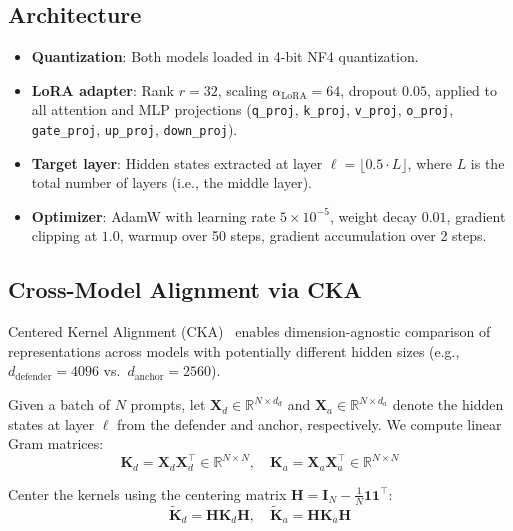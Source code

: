 \documentclass[11pt]{article}
\newcommand{\R}{\mathbb{R}}
\begin{document}
\subsection{Architecture}

\begin{itemize}[noitemsep]
    \item \textbf{Quantization}: Both models loaded in 4-bit NF4 quantization.
    \item \textbf{LoRA adapter}: Rank $r=32$, scaling $\alpha_{\text{LoRA}}=64$, dropout $0.05$, applied to all attention and MLP projections (\texttt{q\_proj}, \texttt{k\_proj}, \texttt{v\_proj}, \texttt{o\_proj}, \texttt{gate\_proj}, \texttt{up\_proj}, \texttt{down\_proj}).
    \item \textbf{Target layer}: Hidden states extracted at layer $\ell = \lfloor 0.5 \cdot L \rfloor$, where $L$ is the total number of layers (i.e., the middle layer).
    \item \textbf{Optimizer}: AdamW with learning rate $5 \times 10^{-5}$, weight decay $0.01$, gradient clipping at $1.0$, warmup over 50 steps, gradient accumulation over 2 steps.
\end{itemize}

\subsection{Cross-Model Alignment via CKA}

Centered Kernel Alignment (CKA)~\cite{kornblith2019similarity} enables dimension-agnostic comparison of representations across models with potentially different hidden sizes (e.g., $d_{\text{defender}} = 4096$ vs.\ $d_{\text{anchor}} = 2560$).

Given a batch of $N$ prompts, let $\mathbf{X}_d \in \R^{N \times d_d}$ and $\mathbf{X}_a \in \R^{N \times d_a}$ denote the hidden states at layer $\ell$ from the defender and anchor, respectively. We compute linear Gram matrices:
\begin{equation}
    \mathbf{K}_d = \mathbf{X}_d \mathbf{X}_d^\top \in \R^{N \times N}, \quad
    \mathbf{K}_a = \mathbf{X}_a \mathbf{X}_a^\top \in \R^{N \times N}
\end{equation}

Center the kernels using the centering matrix $\mathbf{H} = \mathbf{I}_N - \frac{1}{N}\mathbf{1}\mathbf{1}^\top$:
\begin{equation}
    \tilde{\mathbf{K}}_d = \mathbf{H} \mathbf{K}_d \mathbf{H}, \quad
    \tilde{\mathbf{K}}_a = \mathbf{H} \mathbf{K}_a \mathbf{H}
\end{equation}
\end{document}
